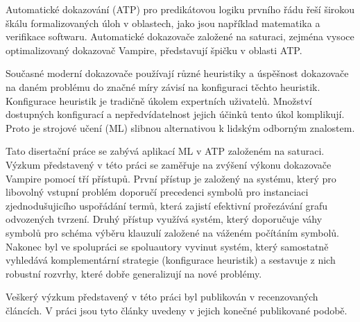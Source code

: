 Automatické dokazování (ATP) pro predikátovou logiku prvního řádu řeší širokou škálu formalizovaných úloh v oblastech, jako jsou například matematika a verifikace softwaru. Automatické dokazovače založené na saturaci, zejména vysoce optimalizovaný dokazovač Vampire, představují špičku v oblasti ATP.

Současné moderní dokazovače používají různé heuristiky a úspěšnost dokazovače na daném problému do značné míry závisí na konfiguraci těchto heuristik. Konfigurace heuristik je tradičně úkolem expertních uživatelů. Množství dostupných konfigurací a nepředvídatelnost jejich účinků tento úkol komplikují. Proto je strojové učení (ML) slibnou alternativou k lidským odborným znalostem.

Tato disertační práce se zabývá aplikací ML v ATP založeném na saturaci. Výzkum představený v této práci se zaměřuje na zvýšení výkonu dokazovače Vampire pomocí tří přístupů. První přístup je založený na systému, který pro libovolný vstupní problém doporučí precedenci symbolů pro instanciaci zjednodušujicího uspořádání termů, která zajistí efektivní prořezávání grafu odvozených tvrzení. Druhý přístup využívá systém, který doporučuje váhy symbolů pro schéma výběru klauzulí založené na váženém počítáním symbolů. Nakonec byl ve spolupráci se spoluautory vyvinut systém, který samostatně vyhledává komplementární strategie (konfigurace heuristik) a sestavuje z nich robustní rozvrhy, které dobře generalizují na nové problémy.

Veškerý výzkum představený v této práci byl publikován v recenzovaných článcích. V práci jsou tyto články uvedeny v jejich konečné publikované podobě.

